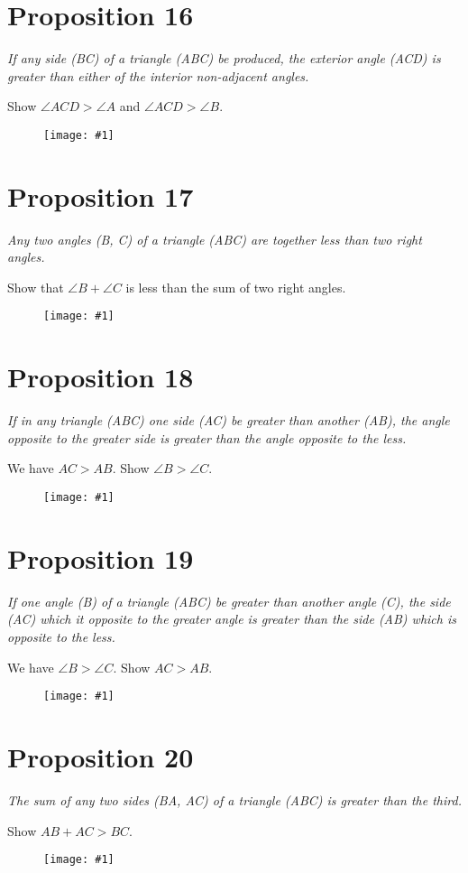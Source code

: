 \documentclass[openany]{book}
\newcommand{\diagram}[1]{
    \vspace*{\fill}
    \begin{figure}[H]
        \centering
        \texttt{[image: \#1]}
    \end{figure}
    \vspace*{\fill}
}
\newenvironment{proposition}
    {\begin{center}\em}
    {\end{center}}
\begin{document}
    \clearpage
    \section{Proposition 16}
    \begin{proposition}
    If any side (BC) of a triangle (ABC) be produced, the exterior angle (ACD) is greater than either of the interior
    non-adjacent angles.
    \end{proposition}
    Show $\angle{ACD} > \angle{A}$ and $\angle{ACD} > \angle{B}$.
    \diagram{prop16.pdf}


    \clearpage
    \section{Proposition 17}
    \begin{proposition}
    Any two angles (B, C) of a triangle (ABC) are together less than two right angles.
    \end{proposition}
    Show that $\angle{B} + \angle{C}$ is less than the sum of two right angles.
    \diagram{prop17.pdf}


    \clearpage
    \section{Proposition 18}
    \begin{proposition}
    If in any triangle (ABC) one side (AC) be greater than another (AB), the angle opposite to the greater side is
    greater than the angle opposite to the less.
    \end{proposition}
    We have $AC > AB$. Show $\angle{B} > \angle{C}.$
    \diagram{prop18.pdf}


    \clearpage
    \section{Proposition 19}
    \begin{proposition}
    If one angle (B) of a triangle (ABC) be greater than another angle (C), the side (AC) which it opposite to the
    greater angle is greater than the side (AB) which is opposite to the less.
    \end{proposition}
    We have $\angle{B} > \angle{C}.$ Show $AC > AB$.
    \diagram{prop19.pdf}


    \clearpage
    \section{Proposition 20}
    \begin{proposition}
    The sum of any two sides (BA, AC) of a triangle (ABC) is greater than the third.
    \end{proposition}
    Show $AB + AC > BC$.
    \diagram{prop20.pdf}
\end{document}
